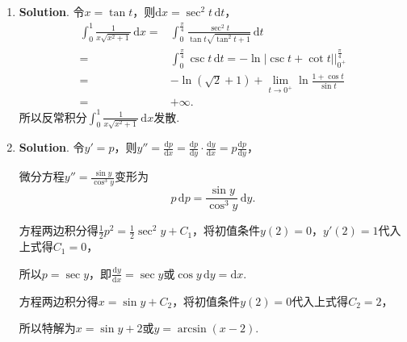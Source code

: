 \documentclass[../main.tex]{subfiles}
\begin{document}
\begin{enumerate}
    \item \textbf{Solution}. 令$x=\tan t$，则$\mathrm{d}x=\sec^{2} t\,\mathrm{d}
              t$，
          \[
              \begin{aligned}
                  \int_{0}^{1}\frac{1}{x\sqrt{x^2+1}}\,\mathrm{d}x = {} & \int_{0}^{\frac{\pi}{4}}\frac{\sec^2 t}{\tan t\sqrt{\tan^2 t+1}}\,\mathrm{d}t                  \\
                  = {}                                                  & \int_{0}^{\frac{\pi}{4}}\csc t\,\mathrm{d}t =  -\ln|\csc t+\cot t|\bigg|_{0^+}^{\frac{\pi}{4}} \\
                  = {}                                                  & -\ln(\sqrt{2}+1)+\lim_{t\to0^+}\ln\frac{1+\cos t}{\sin t}                                      \\
                  = {}                                                  & +\infty.
              \end{aligned}
          \]
          所以反常积分$\int_{0}^{1}\frac{1}{x\sqrt{x^{2}+1}}\,\mathrm{d}x$发散.

    \item \textbf{Solution}. 令$y'=p$，则$y''=\frac{\mathrm{d}p}{\mathrm{d}x}
              =\frac{\mathrm{d}p}{\mathrm{d}y}\cdot \frac{\mathrm{d}y}{\mathrm{d}x}=p\frac{\mathrm{d}p}{\mathrm{d}y}$，

          微分方程$y''=\frac{\sin y}{\cos^{3} y}$变形为
          \[
              p\,\mathrm{d}p=\frac{\sin y}{\cos^{3}y}\,\mathrm{d}y.
          \]

          方程两边积分得$\frac{1}{2}p^{2}=\frac{1}{2}\sec^{2} y+C_{1}$，将初值条件$y(
              2)=0$，$y'(2)=1$代入上式得$C_{1}=0$，

          所以$p=\sec y$，即$\frac{\mathrm{d}y}{\mathrm{d}x}=\sec y$或$\cos y\,\mathrm{d}
              y=\mathrm{d}x$.

          方程两边积分得$x=\sin y+C_{2}$，将初值条件$y(2)=0$代入上式得$C_{2}=2$，

          所以特解为$x=\sin y+2$或$y=\arcsin(x-2)$.
\end{enumerate}
\end{document}
